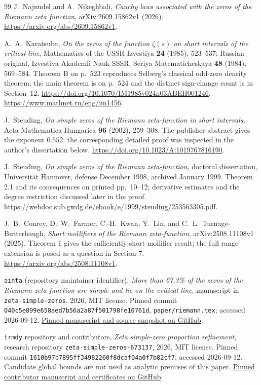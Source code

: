 ﻿\documentclass[11pt]{article}
\theoremstyle{remark}
\begin{document}
\begin{thebibliography}{99}
J.~Najnudel and A.~Nikeghbali,
\emph{Cauchy laws associated with the zeros of the Riemann zeta function},
arXiv:2609.15862v1 (2026).
\url{https://arxiv.org/abs/2609.15862v1}.

A.~A.~Karatsuba,
\emph{On the zeros of the function $\zeta(s)$ on short intervals of the
critical line}, Mathematics of the USSR-Izvestiya \textbf{24} (1985),
523--537; Russian original, Izvestiya Akademii Nauk SSSR, Seriya
Matematicheskaya \textbf{48} (1984), 569--584. Theorem B on p.~523
reproduces Selberg's classical odd-zero density theorem; the main theorem
is on p.~524 and the distinct sign-change count is in Section~12.
\url{https://doi.org/10.1070/IM1985v024n03ABEH001246}.
\url{https://www.mathnet.ru/eng/im1456}.

J.~Steuding,
\emph{On simple zeros of the Riemann zeta-function in short intervals},
Acta Mathematica Hungarica \textbf{96} (2002), 259--308.
The publisher abstract gives the exponent $0.552$; the corresponding
detailed proof was inspected in the author's dissertation below.
\url{https://doi.org/10.1023/A:1019767816190}.

J.~Steuding,
\emph{On simple zeros of the Riemann zeta-function},
doctoral dissertation, Universit\"at Hannover, defense December 1998,
archived January 1999. Theorem 2.1 and its consequences on printed
pp.~10--12; derivative estimates and the degree restriction discussed
later in the proof.
\url{https://webdoc.sub.gwdg.de/ebook/e/1999/steuding/253563305.pdf}.

J.~B.~Conrey, D.~W.~Farmer, C.-H.~Kwan, Y.~Lin, and
C.~L.~Turnage-Butterbaugh,
\emph{Short mollifiers of the Riemann zeta-function},
arXiv:2508.11108v1 (2025).
Theorem 1 gives the sufficiently-short-mollifier result; the full-range
extension is posed as a question in Section 7.
\url{https://arxiv.org/abs/2508.11108v1}.

\texttt{ainta} (repository maintainer identifier),
\emph{More than 67.3\% of the zeros of the Riemann zeta function are
simple and lie on the critical line}, manuscript in
\texttt{zeta-simple-zeros}, 2026, MIT license.
Pinned commit \texttt{040c5e899e658aed7b56a2a87f501798fe10761d},
\texttt{paper/riemann.tex}; accessed 2026-09-12.
\href{https://github.com/ainta/zeta-simple-zeros/tree/040c5e899e658aed7b56a2a87f501798fe10761d}{Pinned manuscript and source snapshot on GitHub}.

\texttt{trmdy} repository and contributors,
\emph{Zeta simple-zero proportion refinement}, research repository
\texttt{zeta-simple-zeros-673137}, 2026, MIT license.
Pinned commit \texttt{1610b97b7895ff34982260f8dcaf04a0f7b82cf7};
accessed 2026-09-12. Candidate global bounds are not used as analytic
premises of this paper.
\href{https://github.com/trmdy/zeta-simple-zeros-673137/tree/1610b97b7895ff34982260f8dcaf04a0f7b82cf7}{Pinned contributor manuscript and certificates on GitHub}.


\end{thebibliography}
\end{document}

